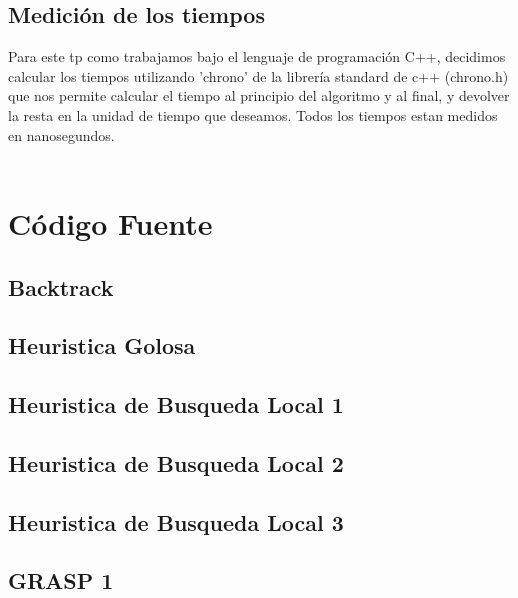 \subsection{Medición de los tiempos}

Para este tp como trabajamos bajo el lenguaje de programación C++, decidimos calcular los tiempos utilizando 'chrono' de la librería standard de c++ (chrono.h) que nos permite calcular el tiempo al principio del algoritmo y al final, y devolver la resta en la unidad de tiempo que deseamos. Todos los tiempos estan medidos en nanosegundos.\\ \\


\section{C\'odigo Fuente}

\subsection{Backtrack}


\subsection{Heuristica Golosa}


\subsection{Heuristica de Busqueda Local 1}


\subsection{Heuristica de Busqueda Local 2}


\subsection{Heuristica de Busqueda Local 3}


\subsection{GRASP 1}

